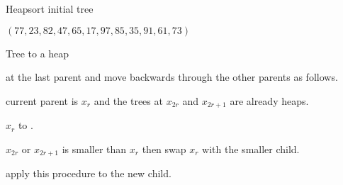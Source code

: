 \begin{frame}[fragile]{Heapsort initial tree}
  \begin{center}
    $(77,23,82,47,65,17,97,85,35,91,61,73)$ \\[1cm]
  \end{center}
\end{frame}


\begin{frame}{Tree to a heap}
  \begin{description}
    \setlength\itemsep{4mm}
    \item[Start] at the last parent and move backwards through the other parents as follows.
    \item[Suppose] current parent is $x_r$ and the trees at $x_{2r}$ and $x_{2r+1}$ are already heaps.
    \item[Compare] $x_r$ to .
    \item[If] $x_{2r}$ or $x_{2r+1}$ is smaller than $x_r$ then swap $x_r$ with the smaller child.
    \item[If necessary] apply this procedure to the new child.
  \end{description}
\end{frame}


